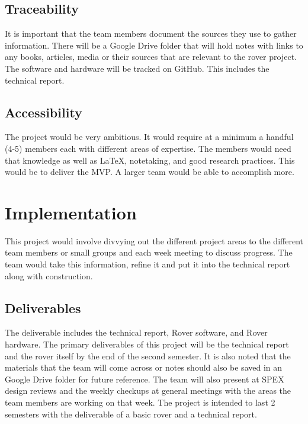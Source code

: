 \documentclass[conference]{IEEEtran} %
\begin{document}
\subsection{Traceability}
\label{subsec:traceability}

It is important that the team members document the sources they use to gather information. 
There will be a Google Drive folder that will hold notes with links to any books, articles, media or their sources that are relevant to the rover project. 
The software and hardware will be tracked on GitHub. 
This includes the technical report.

\subsection{Accessibility}
\label{subsec:plug-n-play}

The project would be very ambitious. It would require at a minimum a handful (4-5) members each with different areas of expertise. 
The members would need that knowledge as well as \LaTeX{}, notetaking, and good research practices. 
This would be to deliver the MVP.
A larger team would be able to accomplish more.  

\section{Implementation}
\label{sec:implementation}

This project would involve divvying out the different project areas to the different team members or small groups and each week meeting to discuss progress. 
The team would take this information, refine it and put it into the technical report along with construction.  

\subsection{Deliverables}
\label{subsec:deliverables}

The deliverable includes the technical report, Rover software, and Rover hardware.
The primary deliverables of this project will be the technical report and the rover itself by the end of the second semester.
It is also noted that the materials that the team will come across or notes should also be saved in an Google Drive folder for future reference. 
The team will also present at SPEX design reviews and the weekly checkups at general meetings with the areas the team members are working on that week.
The project is intended to last 2 semesters with the deliverable of a basic rover and a technical report.   
\end{document}
